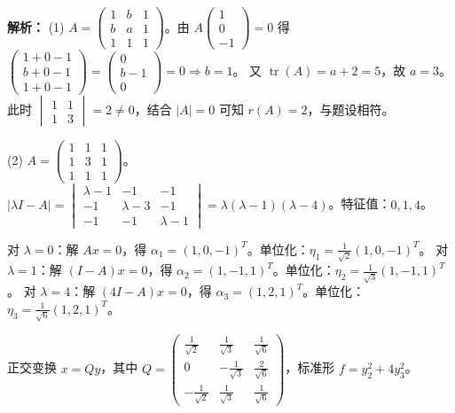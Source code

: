 \ifshowsolutions\par\noindent\textbf{解析：} (1) $A = \begin{pmatrix} 1 & b & 1 \\ b & a & 1 \\ 1 & 1 & 1 \end{pmatrix}$。由 $A\begin{pmatrix}1\\0\\-1\end{pmatrix}=0$ 得 $\begin{pmatrix}1+0-1\\b+0-1\\1+0-1\end{pmatrix}=\begin{pmatrix}0\\b-1\\0\end{pmatrix}=0 \Rightarrow b=1$。
又 $\operatorname{tr}(A)=a+2=5$，故 $a=3$。此时 $\begin{vmatrix}1&1\\1&3\end{vmatrix}=2\neq0$，结合 $|A|=0$ 可知 $r(A)=2$，与题设相符。

(2) $A=\begin{pmatrix}1&1&1\\1&3&1\\1&1&1\end{pmatrix}$。$|\lambda I-A|=\begin{vmatrix}\lambda-1&-1&-1\\-1&\lambda-3&-1\\-1&-1&\lambda-1\end{vmatrix}=\lambda(\lambda-1)(\lambda-4)$。特征值：$0, 1, 4$。

对 $\lambda=0$：解 $Ax=0$，得 $\alpha_1=(1,0,-1)^T$。单位化：$\eta_1=\frac{1}{\sqrt{2}}(1,0,-1)^T$。
对 $\lambda=1$：解 $(I-A)x=0$，得 $\alpha_2=(1,-1,1)^T$。单位化：$\eta_2=\frac{1}{\sqrt{3}}(1,-1,1)^T$。
对 $\lambda=4$：解 $(4I-A)x=0$，得 $\alpha_3=(1,2,1)^T$。单位化：$\eta_3=\frac{1}{\sqrt{6}}(1,2,1)^T$。

正交变换 $x=Qy$，其中 $Q=\begin{pmatrix}\frac{1}{\sqrt{2}}&\frac{1}{\sqrt{3}}&\frac{1}{\sqrt{6}}\\0&-\frac{1}{\sqrt{3}}&\frac{2}{\sqrt{6}}\\-\frac{1}{\sqrt{2}}&\frac{1}{\sqrt{3}}&\frac{1}{\sqrt{6}}\end{pmatrix}$，标准形 $f=y_2^2+4y_3^2$。
\else \answerarea[8] \fi

